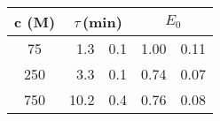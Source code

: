 \begin{tabular}{cr@{$\,\pm\,$}lr@{$\,\pm\,$}l}
\toprule
c (\g{m}M)
     & \multicolumn{2}{c}{$\tau$\,(min)}
                  & \multicolumn{2}{c}{$E_0$} \\
\midrule

  75 &  1.3 & 0.1 &  1.00 & 0.11 \\
 250 &  3.3 & 0.1 &  0.74 & 0.07 \\
 750 & 10.2 & 0.4 &  0.76 & 0.08 \\
\bottomrule
\end{tabular}

